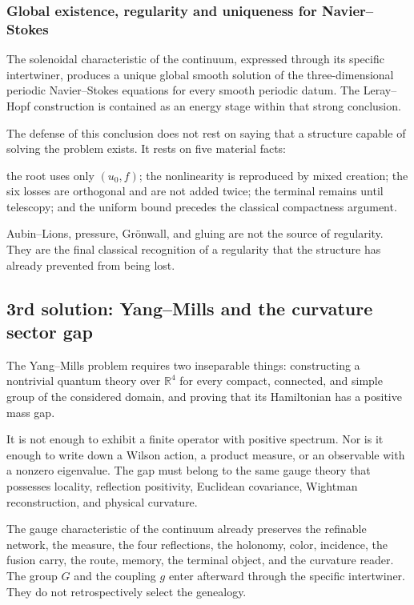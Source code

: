 \subsubsection{Global existence, regularity and uniqueness for Navier--Stokes}
The solenoidal characteristic of the continuum, expressed through its specific intertwiner, produces a unique global smooth solution of the three-dimensional periodic Navier--Stokes equations for every smooth periodic datum. The Leray--Hopf construction is contained as an energy stage within that strong conclusion.\par
The defense of this conclusion does not rest on saying that a structure
capable of solving the problem exists. It rests on five material facts:\par
the root uses only \((u_0,f)\); the nonlinearity is reproduced by mixed creation; the six losses are orthogonal and are not added twice; the terminal remains until telescopy; and the uniform bound precedes the classical compactness argument.\par
Aubin–Lions, pressure, Grönwall, and gluing are not the source of regularity. They are the final classical recognition of a regularity that the structure has already prevented from being lost.\par
{}
\subsection{3rd solution: Yang–Mills and the curvature sector gap}
The Yang–Mills problem requires two inseparable things: constructing a nontrivial quantum theory over \(\mathbb R^4\) for every compact, connected, and simple group of the considered domain, and proving that its Hamiltonian has a positive mass gap.\par
It is not enough to exhibit a finite operator with positive spectrum. Nor is it enough to write down a Wilson action, a product measure, or an observable with a nonzero eigenvalue. The gap must belong to the same gauge theory that possesses locality, reflection positivity, Euclidean covariance, Wightman reconstruction, and physical curvature.\par
The gauge characteristic of the continuum already preserves the refinable network, the measure, the four reflections, the holonomy, color, incidence, the fusion carry, the route, memory, the terminal object, and the curvature reader. The group \(G\) and the coupling \(g\) enter afterward through the specific intertwiner. They do not retrospectively select the genealogy.\par
{}
